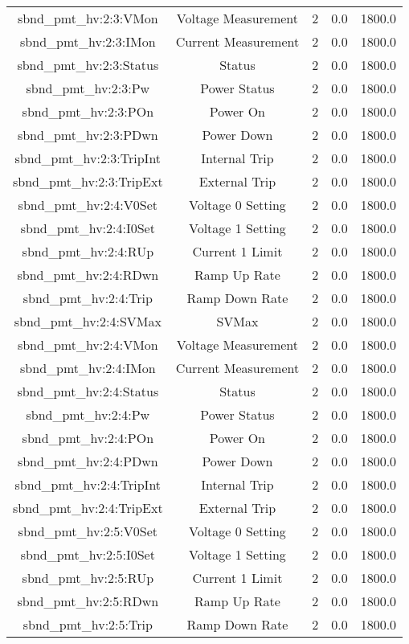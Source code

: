 \begin{table}[ptb]
\begin{tabular}{c | c c c c}
sbnd_pmt_hv:2:3:VMon & Voltage Measurement & 2 & 0.0 & 1800.0\\ 
sbnd_pmt_hv:2:3:IMon & Current Measurement & 2 & 0.0 & 1800.0\\ 
sbnd_pmt_hv:2:3:Status & Status & 2 & 0.0 & 1800.0\\ 
sbnd_pmt_hv:2:3:Pw & Power Status & 2 & 0.0 & 1800.0\\ 
sbnd_pmt_hv:2:3:POn & Power On & 2 & 0.0 & 1800.0\\ 
sbnd_pmt_hv:2:3:PDwn & Power Down & 2 & 0.0 & 1800.0\\ 
sbnd_pmt_hv:2:3:TripInt & Internal Trip & 2 & 0.0 & 1800.0\\ 
sbnd_pmt_hv:2:3:TripExt & External Trip & 2 & 0.0 & 1800.0\\ 
sbnd_pmt_hv:2:4:V0Set & Voltage 0 Setting & 2 & 0.0 & 1800.0\\ 
sbnd_pmt_hv:2:4:I0Set & Voltage 1 Setting & 2 & 0.0 & 1800.0\\ 
sbnd_pmt_hv:2:4:RUp & Current 1 Limit & 2 & 0.0 & 1800.0\\ 
sbnd_pmt_hv:2:4:RDwn & Ramp Up Rate & 2 & 0.0 & 1800.0\\ 
sbnd_pmt_hv:2:4:Trip & Ramp Down Rate & 2 & 0.0 & 1800.0\\ 
sbnd_pmt_hv:2:4:SVMax & SVMax & 2 & 0.0 & 1800.0\\ 
sbnd_pmt_hv:2:4:VMon & Voltage Measurement & 2 & 0.0 & 1800.0\\ 
sbnd_pmt_hv:2:4:IMon & Current Measurement & 2 & 0.0 & 1800.0\\ 
sbnd_pmt_hv:2:4:Status & Status & 2 & 0.0 & 1800.0\\ 
sbnd_pmt_hv:2:4:Pw & Power Status & 2 & 0.0 & 1800.0\\ 
sbnd_pmt_hv:2:4:POn & Power On & 2 & 0.0 & 1800.0\\ 
sbnd_pmt_hv:2:4:PDwn & Power Down & 2 & 0.0 & 1800.0\\ 
sbnd_pmt_hv:2:4:TripInt & Internal Trip & 2 & 0.0 & 1800.0\\ 
sbnd_pmt_hv:2:4:TripExt & External Trip & 2 & 0.0 & 1800.0\\ 
sbnd_pmt_hv:2:5:V0Set & Voltage 0 Setting & 2 & 0.0 & 1800.0\\ 
sbnd_pmt_hv:2:5:I0Set & Voltage 1 Setting & 2 & 0.0 & 1800.0\\ 
sbnd_pmt_hv:2:5:RUp & Current 1 Limit & 2 & 0.0 & 1800.0\\ 
sbnd_pmt_hv:2:5:RDwn & Ramp Up Rate & 2 & 0.0 & 1800.0\\ 
sbnd_pmt_hv:2:5:Trip & Ramp Down Rate & 2 & 0.0 & 1800.0\\ 

\end{tabular}
\end{table}
